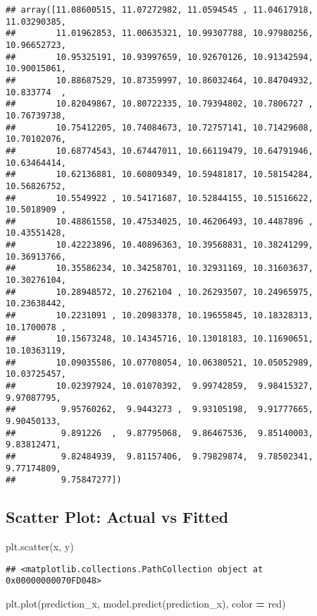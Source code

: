 \documentclass[
]{book}
\newenvironment{Shaded}{\begin{snugshade}}{\end{snugshade}}
\newcommand{\NormalTok}[1]{#1}
\newcommand{\OperatorTok}[1]{\textcolor[rgb]{0.81,0.36,0.00}{\textbf{#1}}}
\newcommand{\StringTok}[1]{\textcolor[rgb]{0.31,0.60,0.02}{#1}}
\begin{document}
\begin{verbatim}
## array([11.08600515, 11.07272982, 11.0594545 , 11.04617918, 11.03290385,
##        11.01962853, 11.00635321, 10.99307788, 10.97980256, 10.96652723,
##        10.95325191, 10.93997659, 10.92670126, 10.91342594, 10.90015061,
##        10.88687529, 10.87359997, 10.86032464, 10.84704932, 10.833774  ,
##        10.82049867, 10.80722335, 10.79394802, 10.7806727 , 10.76739738,
##        10.75412205, 10.74084673, 10.72757141, 10.71429608, 10.70102076,
##        10.68774543, 10.67447011, 10.66119479, 10.64791946, 10.63464414,
##        10.62136881, 10.60809349, 10.59481817, 10.58154284, 10.56826752,
##        10.5549922 , 10.54171687, 10.52844155, 10.51516622, 10.5018909 ,
##        10.48861558, 10.47534025, 10.46206493, 10.4487896 , 10.43551428,
##        10.42223896, 10.40896363, 10.39568831, 10.38241299, 10.36913766,
##        10.35586234, 10.34258701, 10.32931169, 10.31603637, 10.30276104,
##        10.28948572, 10.2762104 , 10.26293507, 10.24965975, 10.23638442,
##        10.2231091 , 10.20983378, 10.19655845, 10.18328313, 10.1700078 ,
##        10.15673248, 10.14345716, 10.13018183, 10.11690651, 10.10363119,
##        10.09035586, 10.07708054, 10.06380521, 10.05052989, 10.03725457,
##        10.02397924, 10.01070392,  9.99742859,  9.98415327,  9.97087795,
##         9.95760262,  9.9443273 ,  9.93105198,  9.91777665,  9.90450133,
##         9.891226  ,  9.87795068,  9.86467536,  9.85140003,  9.83812471,
##         9.82484939,  9.81157406,  9.79829874,  9.78502341,  9.77174809,
##         9.75847277])
\end{verbatim}

\hypertarget{scatter-plot-actual-vs-fitted}{%
\subsection{Scatter Plot: Actual vs Fitted}\label{scatter-plot-actual-vs-fitted}}

\begin{Shaded}
\begin{Highlighting}[]
\NormalTok{plt.scatter(x, y)}
\end{Highlighting}
\end{Shaded}

\begin{verbatim}
## <matplotlib.collections.PathCollection object at 0x00000000070FD048>
\end{verbatim}

\begin{Shaded}
\begin{Highlighting}[]
\NormalTok{plt.plot(prediction\_x, model.predict(prediction\_x), color }\OperatorTok{=} \StringTok{\textquotesingle{}red\textquotesingle{}}\NormalTok{)}
\end{Highlighting}
\end{Shaded}
\end{document}
